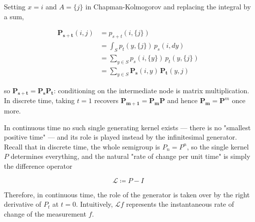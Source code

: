 	\begin{example}
		\label{ex:chapman-kolmogorov-in-discrete-space}
		Setting $x = i$ and $A = \{j\}$ in Chapman-Kolmogorov and replacing the integral by a sum,

		\begin{align}
			\mathbf{P_{s + t}} (i, j) & = p_{s + t} (i, \{j\}) \\
																& = \int_S p_t (y, \{j\}) \, p_s (i, dy) \\
																& = \sum_{y \in S} p_s (i, \{y\}) \, p_t (y, \{j\}) \\
																& = \sum_{y \in S} \mathbf{P_s} (i, y) \, \mathbf{P_t} (y, j)
		\end{align}

		so $\mathbf{P_{s + t}} = \mathbf{P_s} \mathbf{P_t}$: conditioning on the intermediate node is matrix multiplication. In discrete time, taking $t = 1$ recovers $\mathbf{P_{m+1}} = \mathbf{P_m} \mathbf{P}$ and hence $\mathbf{P_m} = \mathbf{P}^m$ once more.
	\end{example}

	In continuous time no such single generating kernel exists --- there is no "smallest positive time" --- and its role is played instead by the infinitesimal generator. Recall that in discrete time, the whole semigroup is $P_n = P^n$, so the single kernel $P$ determines everything, and the natural "rate of change per unit time" is simply the difference operator

		\begin{equation}
			\mathscr{L} \coloneqq P - I
		\end{equation}

	Therefore, in continuous time, the role of the generator is taken over by the right derivative of $P_t$ at $t = 0$. Intuitively, $\mathscr{L} f$ represents the instantaneous rate of change of the measurement $f$. 

